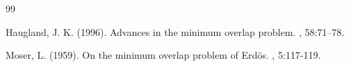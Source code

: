 \documentclass[twoside,twocolumn]{article}
\begin{document}

\begin{thebibliography}{99} %

Haugland, J. K. (1996).
\newblock Advances in the minimum overlap problem.
, 58:71--78.

Moser, L. (1959).
\newblock On the minimum overlap problem of Erd\"{o}s.
, 5:117-119.
\end{thebibliography}

\end{document}

